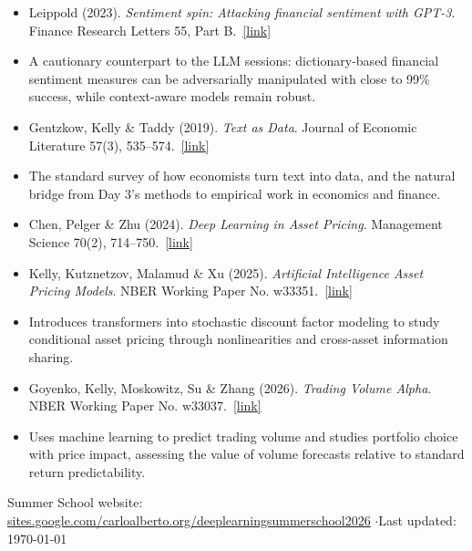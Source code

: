 \documentclass[11pt]{article}
\newcommand{\reading}[5]{%
  \item #1. \textit{#2}. #3.\ \href{#4}{[link]}%
}
\begin{document}
\begin{itemize}
  \reading{Leippold (2023)}{Sentiment spin: Attacking financial sentiment with GPT-3}{Finance Research Letters 55, Part B}{https://doi.org/10.1016/j.frl.2023.103957}{}
  \item[] {\small\color{notegray}A cautionary counterpart to the LLM sessions: dictionary-based financial sentiment measures can be adversarially manipulated with close to 99\% success, while context-aware models remain robust.}
  \reading{Gentzkow, Kelly \& Taddy (2019)}{Text as Data}{Journal of Economic Literature 57(3), 535--574}{https://doi.org/10.1257/jel.20181020}{}
  \item[] {\small\color{notegray}The standard survey of how economists turn text into data, and the natural bridge from Day 3's methods to empirical work in economics and finance.}
  \reading{Chen, Pelger \& Zhu (2024)}{Deep Learning in Asset Pricing}{Management Science 70(2), 714--750}{https://doi.org/10.1287/mnsc.2023.4695}{}
  

  \reading{Kelly, Kutznetzov, Malamud \& Xu (2025)}{Artificial Intelligence Asset Pricing Models}{NBER Working Paper No. w33351}{https://papers.ssrn.com/sol3/papers.cfm?abstract_id=5089371}{}
  \item[] {\small\color{notegray}Introduces transformers into stochastic discount factor modeling to study conditional asset pricing through nonlinearities and cross-asset information sharing.}

  
   \reading{Goyenko, Kelly, Moskowitz, Su \& Zhang (2026)}{Trading Volume Alpha}{NBER Working Paper No. w33037}{https://papers.ssrn.com/sol3/papers.cfm?abstract_id=4802345}{}
  \item[] {\small\color{notegray}Uses machine learning to predict trading volume and studies portfolio choice with price impact, assessing the value of volume forecasts relative to standard return predictability.}   
  
  
\end{itemize}

\vfill
\begin{center}
{\footnotesize\color{notegray}
Summer School website: \href{https://sites.google.com/carloalberto.org/deeplearningsummerschool2026}{sites.google.com/carloalberto.org/deeplearningsummerschool2026}
\quad$\cdot$\quad Last updated: \today}
\end{center}
\end{document}
